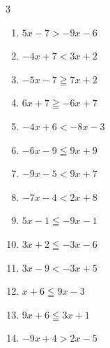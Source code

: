 \begin{multicols}{3}
\begin{enumerate}
  \item $5x-7>-9x-6$


  \item $-4x+7<3x+2$


  \item $-5x-7\geqq 7x+2$


  \item $6x+7\geqq -6x+7$

        \phantom{$\displaystyle x\geqq 0$}

  \item $-4x+6<-8x-3$


\columnbreak %

  \item $-6x-9\leqq 9x+9$


  \item $-9x-5<9x+7$


  \item $-7x-4<2x+8$


  \item $5x-1\leqq -9x-1$

        \phantom{$\displaystyle x\leqq 0$}

  \item $3x+2\leqq -3x-6$


  \item $3x-9<-3x+5$


  \item $x+6\leqq 9x-3$


  \item $9x+6\leqq 3x+1$


  \item $-9x+4>2x-5$


\end{enumerate}
\end{multicols}
